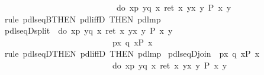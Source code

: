 \begin{isabellebody}
\ \ \ \ \ \ \ \ \ \ \ \ \ \ \ \ \ \ \ \ \ \ \ \ \ {\isasymLongrightarrow}\ {\isasymturnstile}\ {\isacharbrackleft}{\isacharhash}\ do\ {\isacharbraceleft}x{\isasymleftarrow}p{\isacharsemicolon}\ y{\isasymleftarrow}q\ x{\isacharsemicolon}\ ret\ {\isacharparenleft}x{\isacharcomma}\ y{\isacharparenright}{\isacharbraceright}{\isacharbrackright}{\isacharparenleft}{\isasymlambda}{\isacharparenleft}x{\isacharcomma}\ y{\isacharparenright}{\isachardot}\ P\ x\ y{\isacharparenright}{\isachardoublequote}\isanewline
\ \ \isamarkupfalse%
\ {\isacharparenleft}rule\ pdl{\isacharunderscore}seqB{\isacharbrackleft}THEN\ pdl{\isacharunderscore}iffD{}{\isacharcomma}\ THEN\ pdl{\isacharunderscore}mp{\isacharbrackright}{\isacharparenright}\isanewline
\isanewline
\isamarkupfalse%
\ pdl{\isacharunderscore}seqD{\isacharunderscore}split{\isacharcolon}\ {\isachardoublequote}{\isasymturnstile}\ {\isasymlangle}do\ {\isacharbraceleft}x{\isasymleftarrow}p{\isacharsemicolon}\ y{\isasymleftarrow}q\ x{\isacharsemicolon}\ ret\ {\isacharparenleft}x{\isacharcomma}\ y{\isacharparenright}{\isacharbraceright}{\isasymrangle}{\isacharparenleft}{\isasymlambda}{\isacharparenleft}x{\isacharcomma}\ y{\isacharparenright}{\isachardot}\ P\ x\ y{\isacharparenright}\ \isanewline
\ \ \ \ \ \ \ \ \ \ \ \ \ \ \ \ \ \ \ \ \ \ \ \ \ {\isasymLongrightarrow}\ {\isasymturnstile}\ {\isasymlangle}p{\isasymrangle}{\isacharparenleft}{\isasymlambda}x{\isachardot}\ {\isasymlangle}q\ x{\isasymrangle}P\ x{\isacharparenright}{\isachardoublequote}\isanewline
\ \ \isamarkupfalse%
\ {\isacharparenleft}rule\ pdl{\isacharunderscore}seqD{\isacharbrackleft}THEN\ pdl{\isacharunderscore}iffD{}{\isacharcomma}\ THEN\ pdl{\isacharunderscore}mp{\isacharbrackright}{\isacharparenright}\isanewline
\isanewline
\isamarkupfalse%
\ pdl{\isacharunderscore}seqD{\isacharunderscore}join{\isacharcolon}\ {\isachardoublequote}{\isasymturnstile}\ {\isasymlangle}p{\isasymrangle}{\isacharparenleft}{\isasymlambda}x{\isachardot}\ {\isasymlangle}q\ x{\isasymrangle}P\ x{\isacharparenright}\ \isanewline
\ \ \ \ \ \ \ \ \ \ \ \ \ \ \ \ \ \ \ \ \ \ \ \ \ {\isasymLongrightarrow}\ {\isasymturnstile}\ {\isasymlangle}do\ {\isacharbraceleft}x{\isasymleftarrow}p{\isacharsemicolon}\ y{\isasymleftarrow}q\ x{\isacharsemicolon}\ ret\ {\isacharparenleft}x{\isacharcomma}\ y{\isacharparenright}{\isacharbraceright}{\isasymrangle}{\isacharparenleft}{\isasymlambda}{\isacharparenleft}x{\isacharcomma}\ y{\isacharparenright}{\isachardot}\ P\ x\ y{\isacharparenright}{\isachardoublequote}\isanewline

\end{isabellebody}
